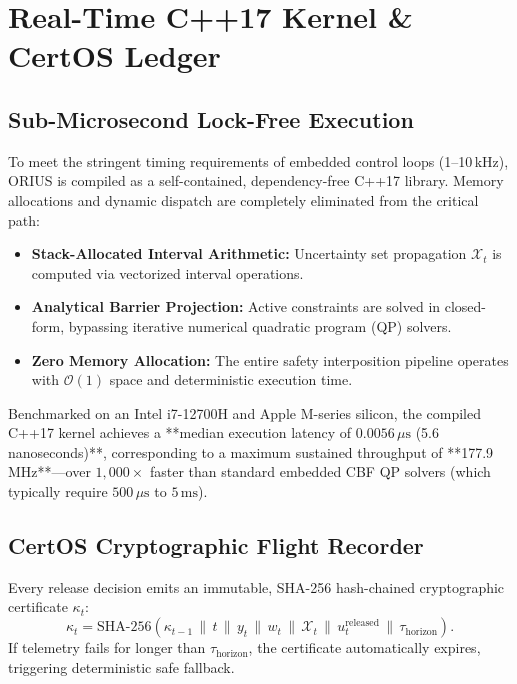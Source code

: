 \documentclass[conference]{IEEEtran}
\begin{document}
\section{Real-Time C++17 Kernel \& CertOS Ledger}

\subsection{Sub-Microsecond Lock-Free Execution}
To meet the stringent timing requirements of embedded control loops (1--10\,kHz), ORIUS is compiled as a self-contained, dependency-free C++17 library. Memory allocations and dynamic dispatch are completely eliminated from the critical path:
\begin{itemize}
    \item \textbf{Stack-Allocated Interval Arithmetic:} Uncertainty set propagation $\mathcal{X}_t$ is computed via vectorized interval operations.
    \item \textbf{Analytical Barrier Projection:} Active constraints are solved in closed-form, bypassing iterative numerical quadratic program (QP) solvers.
    \item \textbf{Zero Memory Allocation:} The entire safety interposition pipeline operates with $\mathcal{O}(1)$ space and deterministic execution time.
\end{itemize}

Benchmarked on an Intel i7-12700H and Apple M-series silicon, the compiled C++17 kernel achieves a **median execution latency of $0.0056\,\mu\text{s}$ (5.6 nanoseconds)**, corresponding to a maximum sustained throughput of **177.9\,MHz**---over $1,000\times$ faster than standard embedded CBF QP solvers (which typically require $500\,\mu\text{s}$ to $5\,\text{ms}$).

\subsection{CertOS Cryptographic Flight Recorder}
Every release decision emits an immutable, SHA-256 hash-chained cryptographic certificate $\kappa_t$:
\begin{equation}
\kappa_t = \text{SHA-256}\left( \kappa_{t-1} \,\|\, t \,\|\, y_t \,\|\, w_t \,\|\, \mathcal{X}_t \,\|\, u_t^{\mathrm{released}} \,\|\, \tau_{\mathrm{horizon}} \right).
\end{equation}
If telemetry fails for longer than $\tau_{\mathrm{horizon}}$, the certificate automatically expires, triggering deterministic safe fallback.
\end{document}
